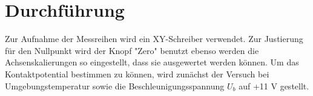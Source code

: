 \section{Durchführung}
Zur Aufnahme der Messreihen wird ein XY-Schreiber
verwendet. Zur Justierung für den Nullpunkt wird der
Knopf "Zero" benutzt ebenso werden die Achsenskalierungen
so eingestellt, dass sie ausgewertet werden können.
Um das Kontaktpotential bestimmen zu können, wird zunächst der
Versuch bei Umgebungstemperatur sowie die Beschleunigungsspannung $U_b$
auf +11 V gestellt. 
